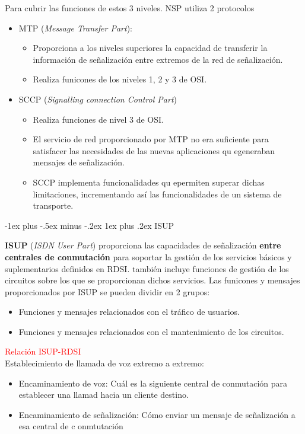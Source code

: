\documentclass[10pt,portrait, twocolumn]{article}
\makeatletter
\renewcommand{\subsubsection}{\@startsection{subsubsection}{3}{0mm}%
                                {-1ex plus -.5ex minus -.2ex}%
                                {1ex plus .2ex}%
                                {\normalfont\small\bfseries}}
\makeatother
\begin{document}
Para cubrir las funciones de estos 3 niveles. NSP utiliza 2 protocolos
	\begin{itemize}
	\item MTP (\textit{Message Transfer Part}):
		\begin{itemize}
		\item Proporciona a los niveles superiores la capacidad de transferir la información de señalización entre extremos de la red de señalización.
		\item Realiza funicones de los niveles 1, 2 y 3 de OSI.
		\end{itemize}
	\item SCCP (\textit{Signalling connection Control Part})
		\begin{itemize}
		\item Realiza funciones de nivel 3 de OSI.
		\item El servicio de red proporcionado por MTP no era suficiente para satisfacer las necesidades de las  nuevas aplicaciones qu egeneraban mensajes de señalización.
		\item SCCP implementa funcionalidades qu epermiten superar dichas limitaciones, incrementando así las funcionalidades de un sistema de transporte.
		\end{itemize}
	\end{itemize}

\subsubsection{ISUP}

\textbf{ISUP} (\textit{ISDN User Part}) proporciona las capacidades de señalización \textbf{entre centrales de conmutación} para soportar la gestión de los servicios básicos y suplementarios definidos en RDSI. también incluye funciones de gestión de los circuitos sobre los que se proporcionan dichos servicios. Las funicones y mensajes proporcionados por ISUP se pueden dividir en 2 grupos:
	\begin{itemize}
	\item Funciones y mensajes relacionados con el tráfico de usuarios.
	\item Funciones y mensajes relacionados con el mantenimiento de los circuitos.
	\end{itemize}
	
\textcolor{red}{Relación ISUP-RDSI}\\

Establecimiento de llamada de voz extremo a extremo:
	\begin{itemize}
	\item Encaminamiento de voz: Cuál es la siguiente central de conmutación para establecer una llamad hacia un cliente destino.
	\item Encaminamiento de señalización: Cómo enviar un mensaje de señalización a esa central de c onmtutación
	\end{itemize}
\end{document}
